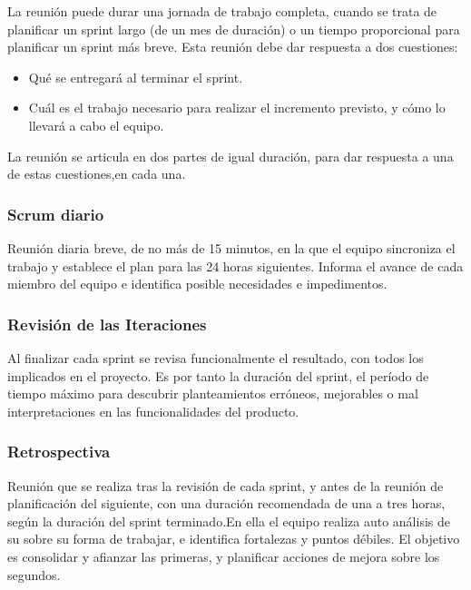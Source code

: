 	La reunión puede durar una jornada de trabajo completa, cuando se trata de planificar un sprint largo (de un mes de duración) o un tiempo proporcional para planificar un sprint más breve. Esta reunión debe dar respuesta a dos cuestiones:

	\begin{itemize}
		\item Qué se entregará al terminar el sprint.

		\item Cuál es el trabajo necesario para realizar el incremento previsto, y cómo lo llevará a cabo el equipo.
	\end{itemize}

\setlength{\parskip}{0mm}
	La  reunión  se  articula  en  dos  partes  de  igual  duración,  para  dar  respuesta  a  una  de  estas  cuestiones,en cada una.
	
\setlength{\parskip}{0mm}

\subsubsection{Scrum diario}
\setlength{\parskip}{5mm}

	Reunión diaria breve, de no más de 15 minutos, en la que el equipo sincroniza el trabajo y establece el plan para las 24 horas siguientes. Informa el avance de cada miembro del equipo e identifica posible necesidades e impedimentos.
	
\setlength{\parskip}{0mm}

\subsubsection{Revisión de las Iteraciones}
\setlength{\parskip}{5mm}

	Al finalizar cada sprint se revisa funcionalmente el resultado, con todos los implicados en el proyecto. Es por tanto la duración del sprint, el período de tiempo máximo para descubrir planteamientos erróneos, mejorables o mal interpretaciones en las funcionalidades del producto.
	
\setlength{\parskip}{0mm}


\subsubsection{Retrospectiva}
\setlength{\parskip}{5mm}

	Reunión que se realiza tras la revisión de cada sprint, y antes de la reunión de planificación del siguiente, con una duración recomendada de una a tres horas, según la duración del sprint terminado.En ella el equipo realiza auto análisis de su sobre su forma de trabajar, e identifica fortalezas y  puntos débiles. El objetivo es consolidar y afianzar las primeras, y planificar acciones de mejora sobre los segundos.

